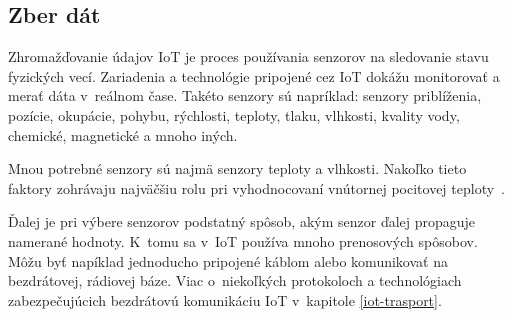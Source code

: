 \subsection{Zber dát}\label{iot-colection}
Zhromažďovanie údajov IoT je proces používania senzorov na sledovanie stavu fyzických vecí. 
Zariadenia a technológie pripojené cez IoT dokážu monitorovať a merať dáta v~reálnom čase. 
Takéto senzory sú napríklad: senzory priblíženia, pozície, okupácie, pohybu, rýchlosti, teploty, tlaku, vlhkosti, kvality vody, chemické, magnetické a mnoho iných.~\cite{8862778}

Mnou potrebné senzory sú najmä senzory teploty a vlhkosti. 
Nakoľko tieto faktory zohrávaju najväčšiu rolu pri vyhodnocovaní vnútornej pocitovej teploty~\cite{AUniversalScaleofApparentTemperature}. 

Ďalej je pri výbere senzorov podstatný spôsob, akým senzor ďalej propaguje namerané hodnoty. 
K~tomu sa v~IoT používa mnoho prenosových spôsobov. 
Môžu byť napíklad jednoducho pripojené káblom alebo komunikovať na bezdrátovej, rádiovej báze. 
Viac o~niekoľkých protokoloch a technológiach zabezpečujúcich bezdrátovú komunikáciu IoT v~kapitole \ref{iot-trasport}.



